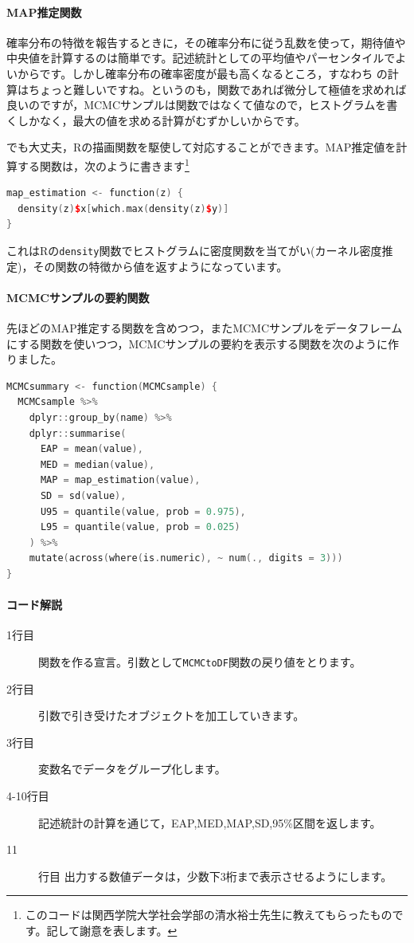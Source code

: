 \documentclass{ltjsbook}
\begin{document}
\paragraph{MAP推定関数}
確率分布の特徴を報告するときに，その確率分布に従う乱数を使って，期待値や中央値を計算するのは簡単です。記述統計としての平均値やパーセンタイルでよいからです。しかし確率分布の確率密度が最も高くなるところ，すなわち の計算はちょっと難しいですね。というのも，関数であれば微分して極値を求めれば良いのですが，MCMCサンプルは関数ではなくて値なので，ヒストグラムを書くしかなく，最大の値を求める計算がむずかしいからです。

でも大丈夫，Rの描画関数を駆使して対応することができます。MAP推定値を計算する関数は，次のように書きます\footnote{このコードは関西学院大学社会学部の清水裕士先生に教えてもらったものです。記して謝意を表します。}

\begin{lstlisting}[language=C++,label={code:PRE_06MAP},caption={MAP推定する関数のコード}]
map_estimation <- function(z) {
  density(z)$x[which.max(density(z)$y)]
}
\end{lstlisting}
これはRの\verb|density|関数でヒストグラムに密度関数を当てがい(カーネル密度推定)，その関数の特徴から値を返すようになっています。

\paragraph{MCMCサンプルの要約関数}
先ほどのMAP推定する関数を含めつつ，またMCMCサンプルをデータフレームにする関数を使いつつ，MCMCサンプルの要約を表示する関数を次のように作りました。
\begin{lstlisting}[language=C++,label={code:PRE_07summary},caption={MCMCの要約を報告するコード}]
MCMCsummary <- function(MCMCsample) {
  MCMCsample %>%
    dplyr::group_by(name) %>%
    dplyr::summarise(
      EAP = mean(value),
      MED = median(value),
      MAP = map_estimation(value),
      SD = sd(value),
      U95 = quantile(value, prob = 0.975),
      L95 = quantile(value, prob = 0.025)
    ) %>%
    mutate(across(where(is.numeric), ~ num(., digits = 3)))
}
\end{lstlisting}
\paragraph{コード解説}
\begin{description}
	\item[1行目] 関数を作る宣言。引数として\verb|MCMCtoDF|関数の戻り値をとります。
	\item[2行目] 引数で引き受けたオブジェクトを加工していきます。
	\item[3行目] 変数名でデータをグループ化します。
	\item[4-10行目] 記述統計の計算を通じて，EAP,MED,MAP,SD,95\%区間を返します。
	\item[11]行目 出力する数値データは，少数下3桁まで表示させるようにします。
\end{description}
\end{document}
